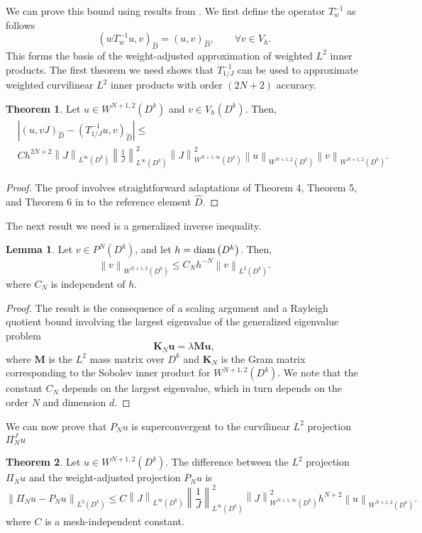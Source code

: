 \documentclass[preprint,10pt]{article}
\theoremstyle{definition}
\theoremstyle{lemma}
\newtheorem{lemma}{Lemma}
\theoremstyle{theorem}
\newtheorem{theorem}{Theorem}
\theoremstyle{assumption}
\renewcommand{\hat}{\widehat}
\newcommand{\nor}[1]{\left\| #1 \right\|}
\newcommand{\LRp}[1]{\left( #1 \right)}
\newcommand{\LRb}[1]{\left| #1 \right|}
\begin{document}
We can prove this bound using results from \cite{chan2016weight1}.  We first define the operator $T_{w}^{-1}$ as follows
\[
\LRp{wT_{w}^{-1} u,v}_{\hat{D}} = \LRp{ u,v}_{\hat{D}}, \qquad \forall v\in V_h.
\]
This forms the basis of the weight-adjusted approximation of weighted $L^2$ inner products.  The first theorem we need shows that $T_{1/J}^{-1}$ can be used to approximate weighted curvilinear $L^2$ inner products with order $(2N+2)$ accuracy.  
\begin{theorem}
\label{thm:moment}
Let $u\in W^{N+1,2}\LRp{D^k}$ and $v\in V_h\LRp{D^k}$.  Then, 
\begin{align*}
&\LRb{\LRp{u,vJ}_{\hat{D}} - \LRp{T^{-1}_{1/J}u,v}_{\hat{D}}} \leq \\
&Ch^{2N+2}\nor{J}_{L^{\infty}\LRp{D^k}}  \nor{\frac{1}{J}}_{L^{\infty}\LRp{D^k}}^2 \nor{J}^2_{W^{N+1,\infty}\LRp{D^k}}\nor{u}_{W^{N+1,2}\LRp{D^k}}\nor{v}_{W^{N+1,2}\LRp{D^k}}.
\end{align*}
\end{theorem}
\begin{proof}
The proof involves straightforward adaptations of Theorem 4, Theorem 5, and Theorem 6 in \cite{chan2016weight1} to the reference element $\hat{D}$.  
\end{proof}
The next result we need is a generalized inverse inequality.  
\begin{lemma}
\label{lemma:sobolev}
Let $v \in P^N\LRp{D^k}$, and let $h = {\rm diam}\LRp{D^k}$.  Then,
\[
\nor{v}_{W^{N+1,2}\LRp{D^k}} \leq C_{N} h^{-N} \nor{v}_{L^2\LRp{D^k}}.
\]
where $C_{N}$ is independent of $h$.
\end{lemma}
\begin{proof}
The result is the consequence of a scaling argument and a Rayleigh quotient bound involving the largest eigenvalue of the generalized eigenvalue problem  
\[
\bm{K}_N\bm{u} = \lambda\bm{M}\bm{u},
\]
where $\bm{M}$ is the $L^2$ mass matrix over $D^k$ and $\bm{K}_N$ is the Gram matrix corresponding to the Sobolev inner product for $W^{N+1,2}\LRp{D^k}$.  We note that the constant $C_N$ depends on the largest eigenvalue, which in turn depends on the order $N$ and dimension $d$.  
\end{proof}

We can now prove that $P_Nu$ is superconvergent to the curvilinear $L^2$ projection $\Pi^J_N u$
\begin{theorem}
Let $u \in W^{N+1,2}\LRp{D^k}$.  The difference between the $L^2$ projection $\Pi_Nu$ and the weight-adjusted projection $P_Nu$ is
\[
\nor{\Pi_N u - P_N u}_{L^2\LRp{D^k}} \leq C\nor{J}_{L^{\infty}\LRp{D^k}}  \nor{\frac{1}{J}}_{L^{\infty}\LRp{D^k}}^2 \nor{J}^2_{W^{N+1,\infty}\LRp{D^k}} h^{N+2}\nor{u}_{W^{N+1,2}\LRp{D^k}}.
\]
where $C$ is a mesh-independent constant.
\end{theorem}
\end{document}
